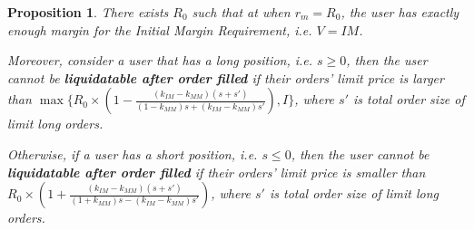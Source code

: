 \documentclass[notitlepage,reqno,11pt]{amsart}
\numberwithin{equation}{section}
\newtheorem{prop}{Proposition}[section]
\begin{document}
\begin{prop}
    There exists $R_0$ such that at when $r_m = R_0$, the user has exactly enough margin for the Initial Margin Requirement, i.e. $V = IM$. 
    
    Moreover, consider a user that has a long position, i.e. $s \geq 0$, then the user cannot be \textbf{liquidatable after order filled} if their orders' limit price is larger than $\max\{R_0\times (1-\frac{(k_{IM} - k_{MM})(s+s')}{(1-k_{MM})s + (k_{IM} - k_{MM})s'}), I\}$, where $s'$ is total order size of limit long orders.

    Otherwise, if a user has a short position, i.e. $s \leq 0$, then the user cannot be \textbf{liquidatable after order filled} if their orders' limit price is smaller than $R_0\times (1+\frac{(k_{IM} - k_{MM})(s+s')}{(1+k_{MM})s - (k_{IM} - k_{MM})s'})$, where $s'$ is total order size of limit long orders.
\end{prop}
\end{document}
